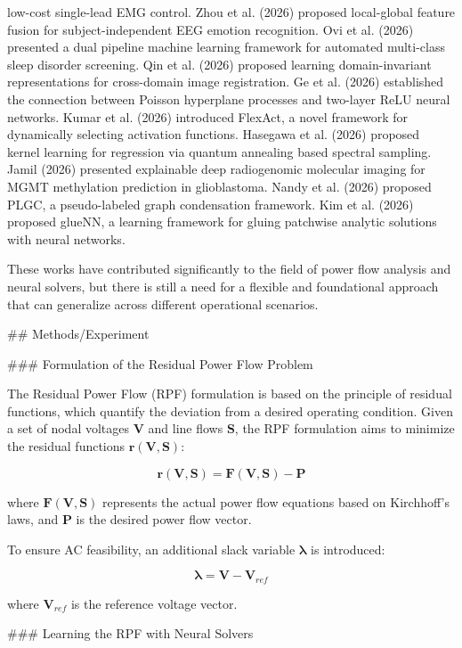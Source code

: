 low-cost single-lead EMG control. Zhou et al. (2026) proposed local-global feature fusion for subject-independent EEG emotion recognition. Ovi et al. (2026) presented a dual pipeline machine learning framework for automated multi-class sleep disorder screening. Qin et al. (2026) proposed learning domain-invariant representations for cross-domain image registration. Ge et al. (2026) established the connection between Poisson hyperplane processes and two-layer ReLU neural networks. Kumar et al. (2026) introduced FlexAct, a novel framework for dynamically selecting activation functions. Hasegawa et al. (2026) proposed kernel learning for regression via quantum annealing based spectral sampling. Jamil (2026) presented explainable deep radiogenomic molecular imaging for MGMT methylation prediction in glioblastoma. Nandy et al. (2026) proposed PLGC, a pseudo-labeled graph condensation framework. Kim et al. (2026) proposed glueNN, a learning framework for gluing patchwise analytic solutions with neural networks.

These works have contributed significantly to the field of power flow analysis and neural solvers, but there is still a need for a flexible and foundational approach that can generalize across different operational scenarios.

## Methods/Experiment

### Formulation of the Residual Power Flow Problem

The Residual Power Flow (RPF) formulation is based on the principle of residual functions, which quantify the deviation from a desired operating condition. Given a set of nodal voltages \( \mathbf{V} \) and line flows \( \mathbf{S} \), the RPF formulation aims to minimize the residual functions \( \mathbf{r}(\mathbf{V}, \mathbf{S}) \):

\[ \mathbf{r}(\mathbf{V}, \mathbf{S}) = \mathbf{F}(\mathbf{V}, \mathbf{S}) - \mathbf{P} \]

where \( \mathbf{F}(\mathbf{V}, \mathbf{S}) \) represents the actual power flow equations based on Kirchhoff's laws, and \( \mathbf{P} \) is the desired power flow vector.

To ensure AC feasibility, an additional slack variable \( \mathbf{\lambda} \) is introduced:

\[ \mathbf{\lambda} = \mathbf{V} - \mathbf{V}_{ref} \]

where \( \mathbf{V}_{ref} \) is the reference voltage vector.

### Learning the RPF with Neural Solvers

